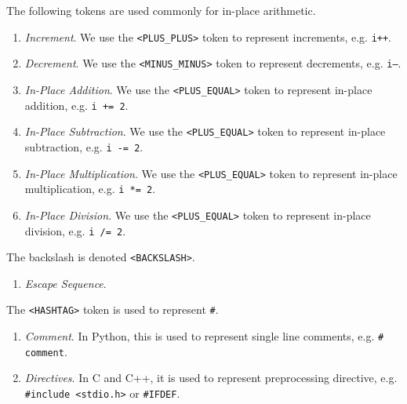   \begin{example}
    \label{ex:in-place-arithmetic}
    The following tokens are used commonly for in-place arithmetic. 
    \begin{enumerate}
      \item \textit{Increment}. We use the \texttt{<PLUS\_PLUS>} token to represent increments, e.g. \texttt{i++}. 
      \item \textit{Decrement}. We use the \texttt{<MINUS\_MINUS>} token to represent decrements, e.g. \texttt{i--}. 
      \item \textit{In-Place Addition}. We use the \texttt{<PLUS\_EQUAL>} token to represent in-place addition, e.g. \texttt{i += 2}. 
      \item \textit{In-Place Subtraction}. We use the \texttt{<PLUS\_EQUAL>} token to represent in-place subtraction, e.g. \texttt{i -= 2}. 
      \item \textit{In-Place Multiplication}. We use the \texttt{<PLUS\_EQUAL>} token to represent in-place multiplication, e.g. \texttt{i *= 2}. 
      \item \textit{In-Place Division}. We use the \texttt{<PLUS\_EQUAL>} token to represent in-place division, e.g. \texttt{i /= 2}. 
    \end{enumerate}
  \end{example}
  
  \begin{example}[Backslash]
    \label{ex:backslash}
    The backslash is denoted \texttt{<BACKSLASH>}. 
    \begin{enumerate}
      \item \textit{Escape Sequence}. 
    \end{enumerate}
  \end{example}

  \begin{example}[Hashtag]
    \label{ex:hashtag}
    The \texttt{<HASHTAG>} token is used to represent \texttt{\#}. 
    \begin{enumerate}
      \item \textit{Comment}. In Python, this is used to represent single line comments, e.g. \texttt{\# comment}. 
      \item \textit{Directives}. In C and C++, it is used to represent preprocessing directive, e.g. \texttt{\#include <stdio.h>} or \texttt{\#IFDEF}. 
    \end{enumerate}
  \end{example}

